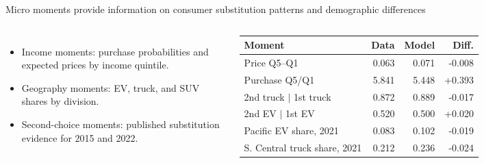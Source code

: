 \documentclass[aspectratio=169,11pt]{beamer}
\begin{document}
\begin{frame}{Micro moments provide information on consumer substitution patterns and demographic differences}
  \begin{columns}[T,onlytextwidth]
      \begin{itemize}
        \item Income moments: purchase probabilities and expected prices by income quintile.
        \item Geography moments: EV, truck, and SUV shares by division.
        \item Second-choice moments: published substitution evidence for 2015 and 2022.
      \end{itemize}
      \scriptsize
      \begin{tabular}{@{}lrrr@{}}
        \toprule
        Moment & Data & Model & Diff. \\
        \midrule
        Price Q5--Q1 & 0.063 & 0.071 & -0.008 \\
        Purchase Q5/Q1 & 5.841 & 5.448 & +0.393 \\
        2nd truck \(|\) 1st truck & 0.872 & 0.889 & -0.017 \\
        2nd EV \(|\) 1st EV & 0.520 & 0.500 & +0.020 \\
        Pacific EV share, 2021 & 0.083 & 0.102 & -0.019 \\
        S. Central truck share, 2021 & 0.212 & 0.236 & -0.024 \\
        \bottomrule
      \end{tabular}
  \end{columns}
\end{frame}
\end{document}
